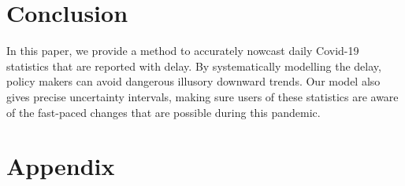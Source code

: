 \documentclass[a4paper,11pt,article,oneside,openany,american]{memoir}
\begin{document}
\chapter{Conclusion}
In this paper, we provide a method to accurately nowcast daily Covid-19 statistics that are reported with delay. By systematically modelling the delay, policy makers can avoid dangerous illusory downward trends. Our model also gives precise uncertainty intervals, making sure users of these statistics are aware of the fast-paced changes that are possible during this pandemic.

\printbibliography%
\backmatter%
\appendix%
\chapter{Appendix}
%
\end{document}
